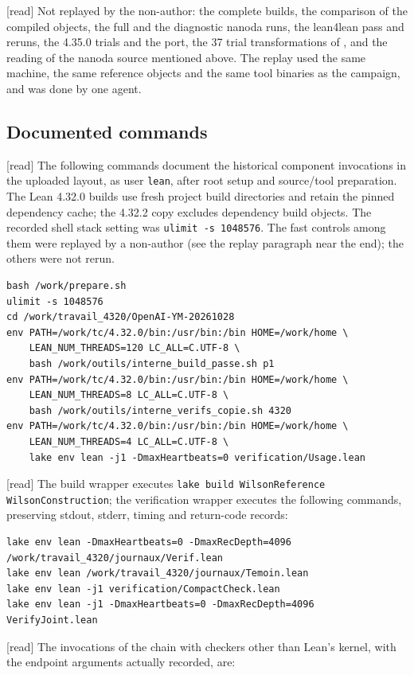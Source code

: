 \documentclass[11pt,a4paper]{article}
\theoremstyle{plain}
\theoremstyle{definition}
\theoremstyle{remark}
\numberwithin{equation}{section}
\newcommand{\st}[1]{\textsf{[#1]}}
\begin{document}
\st{read} Not replayed by the non-author: the complete builds, the comparison of the compiled objects, the full and the diagnostic nanoda runs,
the lean4lean pass and reruns, the 4.35.0 trials and the port, the 37 trial transformations of , and the reading of the nanoda source
mentioned above. The replay used the same machine, the same reference objects and the same tool binaries as the campaign, and was done by one agent.

\subsection*{Documented commands}

\st{read} The following commands document the historical component invocations in the uploaded 
layout, as user \texttt{lean}, after root setup and source/tool preparation. The Lean 4.32.0 builds use fresh project
build directories and retain the pinned dependency cache; the 4.32.2 copy excludes dependency build objects.
The recorded shell stack setting was \texttt{ulimit -s 1048576}. The fast controls among them were replayed by a non-author (see the replay paragraph near the end); the others were not rerun.
\begingroup\scriptsize
\begin{verbatim}
bash /work/prepare.sh
ulimit -s 1048576
cd /work/travail_4320/OpenAI-YM-20261028
env PATH=/work/tc/4.32.0/bin:/usr/bin:/bin HOME=/work/home \
    LEAN_NUM_THREADS=120 LC_ALL=C.UTF-8 \
    bash /work/outils/interne_build_passe.sh p1
env PATH=/work/tc/4.32.0/bin:/usr/bin:/bin HOME=/work/home \
    LEAN_NUM_THREADS=8 LC_ALL=C.UTF-8 \
    bash /work/outils/interne_verifs_copie.sh 4320
env PATH=/work/tc/4.32.0/bin:/usr/bin:/bin HOME=/work/home \
    LEAN_NUM_THREADS=4 LC_ALL=C.UTF-8 \
    lake env lean -j1 -DmaxHeartbeats=0 verification/Usage.lean
\end{verbatim}
\endgroup
\st{read} The build wrapper executes \texttt{lake build WilsonReference WilsonConstruction}; the verification
wrapper executes the following commands, preserving stdout, stderr, timing and return-code records:
\begingroup\scriptsize
\begin{verbatim}
lake env lean -DmaxHeartbeats=0 -DmaxRecDepth=4096 /work/travail_4320/journaux/Verif.lean
lake env lean /work/travail_4320/journaux/Temoin.lean
lake env lean -j1 verification/CompactCheck.lean
lake env lean -j1 -DmaxHeartbeats=0 -DmaxRecDepth=4096 VerifyJoint.lean
\end{verbatim}
\endgroup
\st{read} The invocations of the chain with checkers other than Lean's kernel, with the endpoint arguments actually recorded, are:
\end{document}
